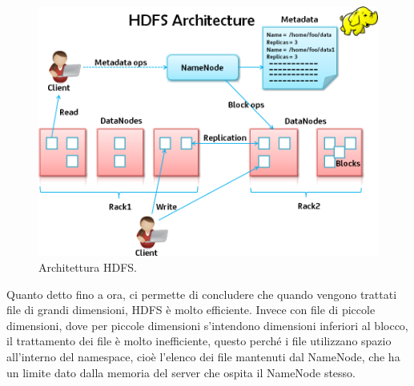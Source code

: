 \begin{figure}[H]
	\centering
	\includegraphics[width=\textwidth, height=0.40\textheight, keepaspectratio]{images/HDFSArchitetture.png}
	\caption{Architettura HDFS.}
	\label{fig:HadoopHDFS}
\end{figure} 
Quanto detto fino a ora, ci permette di concludere che quando vengono trattati file di grandi dimensioni, HDFS è molto efficiente. Invece con file di piccole dimensioni, dove per piccole dimensioni s'intendono dimensioni inferiori al blocco, il trattamento dei file è molto inefficiente, questo perché i file utilizzano spazio all'interno del namespace, cioè l'elenco dei file mantenuti dal NameNode, che ha un limite dato dalla memoria del server che ospita il NameNode stesso. 

